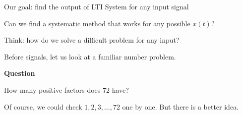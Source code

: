 \documentclass[aspectratio=169,11pt]{beamer}
\newcommand{\CardTitleSize}{\large}
\newcommand{\CardTitle}[1]{%
  \vspace{0.15cm}
  {\CardTitleSize\bfseries #1}\par
}
\begin{document}
\begin{frame}{Our goal: find the output of LTI System for any input signal}
\begin{center}
\begin{GreenCard}[
  width=0.98\textwidth,
  halign=center,
  top=12pt,
  bottom=12pt
]

\vspace{0.08cm}

\begin{OrangeBox}[
  calloutshadedorange,
  halign=center,
  fontupper=\large
]{}
Can we find a systematic method that works for any possible \(x(t)\)?
\end{OrangeBox}

\end{GreenCard}
\end{center}

\end{frame}





\begin{frame}{Think: how do we solve a difficult problem for any input?}

\begin{OrangeBox}[
  calloutshadedorange,
  fontupper=\large,
  halign=center
]{}
Before signals, let us look at a familiar number problem.
\end{OrangeBox}

\vspace{0.18cm}

\begin{center}
\begin{BlueCard}[
  width=0.82\textwidth,
  halign=center,
  top=16pt,
  bottom=16pt
]
\CardTitle{Question}

\vspace{0.12cm}



{\Large
How many positive factors does \textbf{\(72\)} have?
}

\vspace{0.14cm}

\begin{GreenBox}[
  calloutshadedgreen,
  halign=center,
  fontupper=\large
]{}
Of course, we could check \(1,2,3,\ldots,72\) one by one.  
But there is a better idea.
\end{GreenBox}

\end{BlueCard}
\end{center}

\end{frame}
\end{document}
